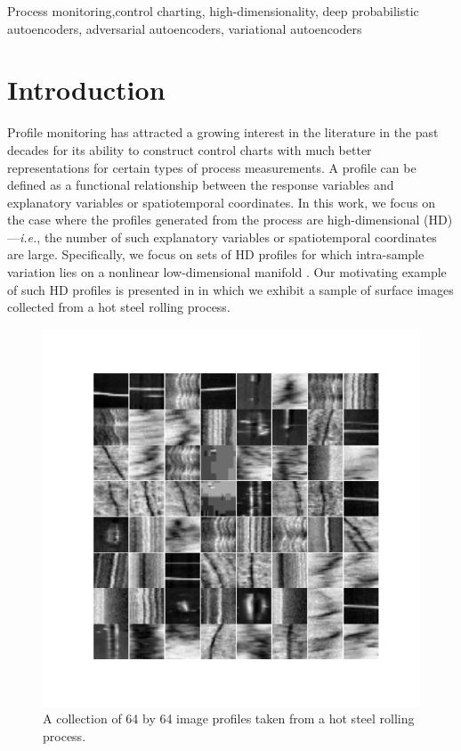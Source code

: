 \documentclass[journal, peerreview]{IEEEtran}
\begin{document}
\ifCLASSOPTIONpeerreview

\else
	\begin{IEEEkeywords}
	Process monitoring,control charting, high-dimensionality, deep probabilistic autoencoders, adversarial autoencoders, variational autoencoders
	\end{IEEEkeywords}
\fi

\IEEEpeerreviewmaketitle


\section{Introduction}
\label{sec:introduction}
Profile monitoring has attracted a growing interest in the literature in the past decades \cite{Woodall2004-bp,Woodall2007-xs,Maleki2018-uo} for its ability to construct control charts with much better representations for certain types of process measurements.
A profile can be defined as a functional relationship between the  response variables and explanatory variables or spatiotemporal coordinates.
In this work, we focus on the case where the profiles generated from the process are high-dimensional (HD)---\textit{i.e.}, the number of such explanatory variables or spatiotemporal coordinates are large.
Specifically, we focus on sets of HD profiles for which intra-sample variation lies on a nonlinear low-dimensional manifold \cite{Shi2016-tg}.
Our motivating example of such HD profiles is presented in  in which we exhibit a sample of surface images collected from a hot steel rolling process.

\begin{figure}[t]
	\centering
	\includegraphics[width=0.9\linewidth]{figs/profile_examples.pdf}
	\caption{A collection of 64 by 64 image profiles taken from a hot steel rolling process.}
	\label{fig:Rolling}
\end{figure}
\end{document}
